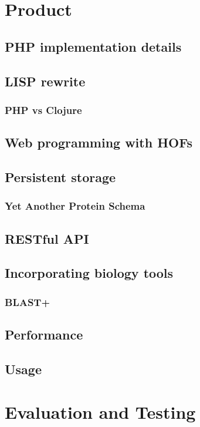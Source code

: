 \documentclass[12pt]{report}
\begin{document}
\chapter{Product}

\section{PHP implementation details}

\section{LISP rewrite}
\subsection{PHP vs Clojure}
\section{Web programming with HOFs}

\section{Persistent storage}
\subsection{Yet Another Protein Schema}

\section{RESTful API}

\section{Incorporating biology tools}
\subsection{BLAST+}

\section{Performance}

\section{Usage}

\chapter{Evaluation and Testing}



\appendix

\printbibliography
\end{document}
